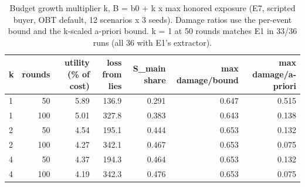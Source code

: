 \begin{table}[t]
\centering
\small
\caption{Budget growth multiplier k, B = b0 + k x max honored exposure (E7, scripted buyer, OBT default, 12 scenarios x 3 seeds). Damage ratios use the per-event bound and the k-scaled a-priori bound. k = 1 at 50 rounds matches E1 in 33/36 runs (all 36 with E1's extractor).}
\label{tab:budget_k}
\begin{tabular}{lrrrrrr}
\toprule
k & rounds & utility (\% of cost) & loss from lies & S\_main share & max damage/bound & max damage/a-priori \\
\midrule
1 & 50 & 5.89 & 136.9 & 0.291 & 0.647 & 0.515 \\
1 & 100 & 5.01 & 327.8 & 0.383 & 0.643 & 0.138 \\
2 & 50 & 4.54 & 195.1 & 0.444 & 0.653 & 0.132 \\
2 & 100 & 4.27 & 342.1 & 0.467 & 0.653 & 0.075 \\
4 & 50 & 4.37 & 194.3 & 0.464 & 0.653 & 0.132 \\
4 & 100 & 4.19 & 342.3 & 0.476 & 0.653 & 0.075 \\
\bottomrule
\end{tabular}
\end{table}
